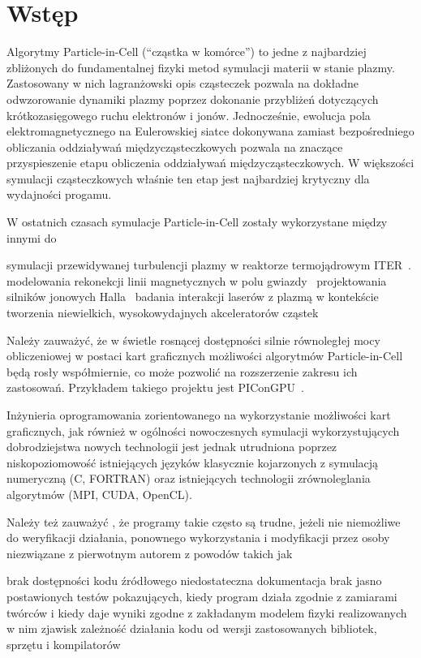 \section[Wstęp]{Wstęp}\label{sec:intro} %
Algorytmy Particle-in-Cell (``cząstka w komórce'') to jedne z najbardziej
zbliżonych do fundamentalnej fizyki metod symulacji materii w stanie plazmy.
Zastosowany w nich lagranżowski opis cząsteczek pozwala na dokładne
odwzorowanie dynamiki plazmy poprzez dokonanie przybliżeń dotyczących
krótkozasięgowego ruchu elektronów i jonów. Jednocześnie, ewolucja pola
elektromagnetycznego na Eulerowskiej siatce dokonywana zamiast bezpośredniego
obliczania oddziaływań międzycząsteczkowych pozwala na znaczące przyspieszenie
etapu obliczenia oddziaływań międzycząsteczkowych. W większości symulacji
cząsteczkowych właśnie ten etap jest najbardziej krytyczny dla wydajności
progamu.\cite{birdsall}

W ostatnich czasach symulacje Particle-in-Cell zostały wykorzystane między innymi do
\begin{itemize}
\itemi{} symulacji przewidywanej turbulencji plazmy w reaktorze termojądrowym ITER~\cite{pic-hammett}.
\itemi{} modelowania rekonekcji linii magnetycznych w polu gwiazdy~\cite{pic-reconnection}
\itemi{} projektowania silników jonowych Halla~\cite{pic-hallengine}
\itemi{} badania interakcji laserów z plazmą w kontekście tworzenia niewielkich,
    wysokowydajnych akceleratorów cząstek~\cite{pic-laserplasma}
\end{itemize}

Należy zauważyć, że w świetle rosnącej dostępności silnie równoległej mocy
obliczeniowej w postaci kart graficznych możliwości algorytmów Particle-in-Cell
będą rosły współmiernie, co może pozwolić na rozszerzenie zakresu ich
zastosowań. Przykładem takiego projektu jest PIConGPU~\cite{picongpu}.

Inżynieria oprogramowania zorientowanego na wykorzystanie możliwości kart
graficznych, jak również w ogólności nowoczesnych symulacji wykorzystujących
dobrodziejstwa nowych technologii jest jednak utrudniona poprzez
niskopoziomowość istniejących języków klasycznie kojarzonych z symulacją
numeryczną (C, FORTRAN) oraz istniejących technologii zrównoleglania algorytmów
(MPI, CUDA, OpenCL).

Należy też zauważyć%
, że programy takie często są
trudne, jeżeli nie niemożliwe do weryfikacji działania, ponownego wykorzystania
i modyfikacji przez osoby niezwiązane z pierwotnym autorem z powodów takich jak
\begin{itemize}
    \itemi{} brak dostępności kodu źródłowego
    \itemi{} niedostateczna dokumentacja
    \itemi{} brak jasno postawionych testów pokazujących, kiedy program działa
    zgodnie z zamiarami twórców i kiedy daje wyniki zgodne z zakładanym
    modelem fizyki realizowanych w nim zjawisk
    \itemi{} zależność działania kodu od wersji zastosowanych bibliotek, sprzętu i kompilatorów
\end{itemize}

